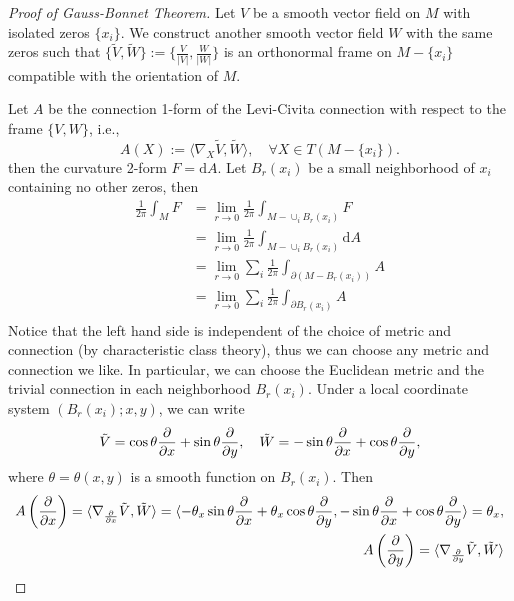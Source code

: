 \begin{proof}[Proof of Gauss-Bonnet Theorem]
    Let $V$ be a smooth vector field on $M$ with isolated zeros $\{x_i\}$. 
    We construct another smooth vector field $W$ with the same zeros 
    such that $\{\tilde{V},\tilde{W}\}:=\{\frac{V}{|V|}, \frac{W}{|W|}\}$ is an orthonormal frame on $M - \{x_i\}$ compatible with the orientation of $M$. 

    Let $A$ be the connection 1-form of the Levi-Civita connection with respect to the frame $\{V,W\}$, i.e., 
    \begin{equation*}
        A(X):= \langle \nabla_X \tilde{V}, \tilde{W} \rangle, \quad \forall X \in T(M - \{x_i\}).
    \end{equation*}
    then the curvature 2-form $F = \mathrm{d}A$. Let $B_r(x_i)$ be a small neighborhood of $x_i$ containing no other zeros, then 
    \begin{align*}
        \frac{1}{2\pi}\int_M F &= \lim_{r\to 0} \frac{1}{2\pi}\int_{M - \cup_i B_r(x_i)} F \\ 
        &= \lim_{r\to 0} \frac{1}{2\pi}\int_{M - \cup_i B_r(x_i)} \mathrm{d}A \\ 
        &= \lim_{r\to 0} \sum_i \frac{1}{2\pi}\int_{\partial(M - B_r(x_i))} A \\ 
        &= \lim_{r\to 0} \sum_i \frac{1}{2\pi}\int_{\partial B_r(x_i)} A \\
    \end{align*}
    Notice that the left hand side is independent of the choice of metric and connection (by characteristic class theory), 
    thus we can choose any metric and connection we like. In particular, 
    we can choose the Euclidean metric and the trivial connection in each neighborhood $B_r(x_i)$. 
    Under a local coordinate system $(B_r(x_i); x, y)$, we can write 
    \begin{equation*}
        \tilde{V} = \cos\theta \frac{\partial }{\partial x} + \sin\theta \frac{\partial }{\partial y}, \quad \tilde{W} = -\sin\theta \frac{\partial }{\partial x} + \cos\theta \frac{\partial }{\partial y},
    \end{equation*}
    where $\theta = \theta(x,y)$ is a smooth function on $B_r(x_i)$. 
    Then 
    \begin{align*}
        A\left(\pd{}{x}\right) = \langle \nabla_{\pd{}{x}} \tilde{V}, \tilde{W} \rangle 
        = \langle -\theta_x\sin\theta \pd{}{x} + \theta_x\cos\theta \pd{}{y}, -\sin\theta \pd{}{x} + \cos\theta \pd{}{y} \rangle 
        = \theta_x, \\ 
        A\left(\pd{}{y}\right) = \langle \nabla_{\pd{}{y}} \tilde{V}, \tilde{W} \rangle 

\end{align*}
\end{proof}

